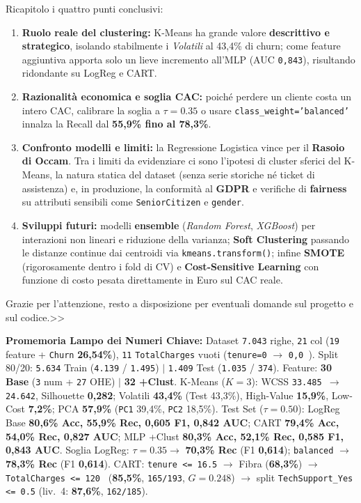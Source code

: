 \documentclass[10pt, a4paper]{article}
\begin{document}
Ricapitolo i quattro punti conclusivi:
\begin{enumerate}
    \item \textbf{Ruolo reale del clustering:} K-Means ha grande valore \textbf{descrittivo e strategico}, isolando stabilmente i \textit{Volatili} al 43,4\% di churn; come feature aggiuntiva apporta solo un lieve incremento all'MLP (AUC \texttt{0,843}), risultando ridondante su LogReg e CART.
    \item \textbf{Razionalità economica e soglia CAC:} poiché perdere un cliente costa un intero CAC, calibrare la soglia a $\tau=0.35$ o usare \texttt{class\_weight='balanced'} innalza la Recall dal \textbf{55,9\% fino al 78,3\%}.
    \item \textbf{Confronto modelli e limiti:} la Regressione Logistica vince per il \textbf{Rasoio di Occam}. Tra i limiti da evidenziare ci sono l'ipotesi di cluster sferici del K-Means, la natura statica del dataset (senza serie storiche né ticket di assistenza) e, in produzione, la conformità al \textbf{GDPR} e verifiche di \textbf{fairness} su attributi sensibili come \texttt{SeniorCitizen} e \texttt{gender}.
    \item \textbf{Sviluppi futuri:} modelli \textbf{ensemble} (\textit{Random Forest}, \textit{XGBoost}) per interazioni non lineari e riduzione della varianza; \textbf{Soft Clustering} passando le distanze continue dai centroidi via \texttt{kmeans.transform()}; infine \textbf{SMOTE} (rigorosamente dentro i fold di CV) e \textbf{Cost-Sensitive Learning} con funzione di costo pesata direttamente in Euro sul CAC reale.
\end{enumerate}
Grazie per l'attenzione, resto a disposizione per eventuali domande sul progetto e sul codice.>>

\vspace{3mm}
\noindent\colorbox{LightBg}{\parbox{\dimexpr\linewidth-2\fboxsep}{
\footnotesize
\textbf{\color{PrimaryNavy}Promemoria Lampo dei Numeri Chiave:}
Dataset \texttt{7.043} righe, \texttt{21} col (\texttt{19} feature + \texttt{Churn} \textbf{26,54\%}), \texttt{11} \texttt{TotalCharges} vuoti (\texttt{tenure=0} $\rightarrow$ \texttt{0,0\,\texteuro}).
Split 80/20: \texttt{5.634} Train (\texttt{4.139} / \texttt{1.495}) $|$ \texttt{1.409} Test (\texttt{1.035} / \texttt{374}).
Feature: \textbf{30 Base} (\texttt{3} num + \texttt{27} OHE) $|$ \textbf{32 +Clust}.
K-Means ($K=3$): WCSS \texttt{33.485 $\rightarrow$ 24.642}, Silhouette \textbf{0,282}; Volatili \textbf{43,4\%} (Test 43,3\%), High-Value \textbf{15,9\%}, Low-Cost \textbf{7,2\%}; PCA \textbf{57,9\%} (\texttt{PC1} 39,4\%, \texttt{PC2} 18,5\%).
Test Set ($\tau=0.50$): LogReg Base \textbf{80,6\% Acc, 55,9\% Rec, 0,605 F1, 0,842 AUC}; CART \textbf{79,4\% Acc, 54,0\% Rec, 0,827 AUC}; MLP +Clust \textbf{80,3\% Acc, 52,1\% Rec, 0,585 F1, 0,843 AUC}.
Soglia LogReg: $\tau=0.35 \rightarrow$ \textbf{70,3\% Rec} (F1 \textbf{0,614}); \texttt{balanced} $\rightarrow$ \textbf{78,3\% Rec} (F1 \textbf{0,614}).
CART: \texttt{tenure <= 16.5} $\rightarrow$ Fibra (\textbf{68,3\%}) $\rightarrow$ \texttt{TotalCharges <= 120\,\texteuro} (\textbf{85,5\%}, \texttt{165/193}, $G=0.248$) $\rightarrow$ split \texttt{TechSupport\_Yes <= 0.5} (liv.\ 4: \textbf{87,6\%}, \texttt{162/185}).
}}
\end{document}
